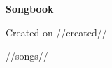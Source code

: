 \documentclass[twoside,a4paper]{article}
\begin{document}

\strut
\vfill
\begin{center}
\sffamily
\bfseries
\fontsize{110pt}{90pt}
\selectfont
Songbook
\end{center}

\vspace{1cm}

\begin{center}
Created on //created//
\end{center}
\vfill

\cleardoublepage


\begin{multicols}{2}
\pagestyle{plain}
\tableofcontents
\cleardoublepage
\end{multicols}


\raggedcolumns

\begin{multicols*}{2}
\pagestyle{fancy}
//songs//
\end{multicols*}
\end{document}
